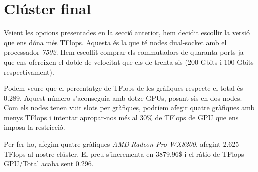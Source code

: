 \section{Clúster final}
Veient les opcions presentades en la secció anterior,  hem decidit escollir la versió que ens dóna més TFlops. Aquesta és la que té nodes dual-socket amb el processador \textit{7502}. Hem escollit comprar els commutadors de quaranta ports ja que ens ofereixen el doble de velocitat que els de trenta-sis (200 Gbits i 100 Gbits respectivament).

Podem veure que el percentatge de TFlops de les gràfiques respecte el total és 0.289. Aquest número s'aconseguia amb dotze GPUs, posant sis en dos nodes. Com els nodes tenen vuit slots per gràfiques, podríem afegir quatre gràfiques amb menys TFlops i intentar apropar-nos més al 30\% de TFlops de GPU que ens imposa la restricció.

Per fer-ho, afegim quatre gràfiques \textit{AMD Radeon Pro WX8200}, afegint 2.625 TFlops al nostre clúster. El preu s'incrementa en 3879.96\$ i el ràtio de TFlops GPU/Total acaba sent 0.296.

